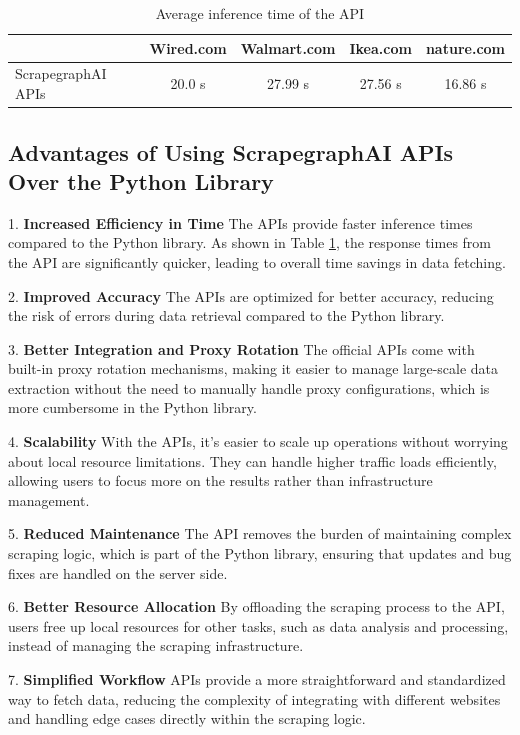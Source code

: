 \begin{table}[h!]
\centering
\begin{tabular}{|l|c|c|c|c|}
\hline
                & Wired.com & Walmart.com & Ikea.com & nature.com \\ \hline
ScrapegraphAI APIs   &    20.0 s      &  27.99 s    &  27.56 s & 16.86 s            \\ \hline
\end{tabular}
\caption{Average inference time of the API}
\label{tab:comparison}
\end{table}

\newpage

\subsection{Advantages of Using ScrapegraphAI APIs Over the Python Library}

1. \textbf{Increased Efficiency in Time}  
   The APIs provide faster inference times compared to the Python library. As shown in Table \ref{tab:comparison}, the response times from the API are significantly quicker, leading to overall time savings in data fetching.

2. \textbf{Improved Accuracy}  
   The APIs are optimized for better accuracy, reducing the risk of errors during data retrieval compared to the Python library.

3. \textbf{Better Integration and Proxy Rotation}  
   The official APIs come with built-in proxy rotation mechanisms, making it easier to manage large-scale data extraction without the need to manually handle proxy configurations, which is more cumbersome in the Python library.

4. \textbf{Scalability}  
   With the APIs, it's easier to scale up operations without worrying about local resource limitations. They can handle higher traffic loads efficiently, allowing users to focus more on the results rather than infrastructure management.

5. \textbf{Reduced Maintenance}  
   The API removes the burden of maintaining complex scraping logic, which is part of the Python library, ensuring that updates and bug fixes are handled on the server side.

6. \textbf{Better Resource Allocation}  
   By offloading the scraping process to the API, users free up local resources for other tasks, such as data analysis and processing, instead of managing the scraping infrastructure.

7. \textbf{Simplified Workflow}  
   APIs provide a more straightforward and standardized way to fetch data, reducing the complexity of integrating with different websites and handling edge cases directly within the scraping logic.

